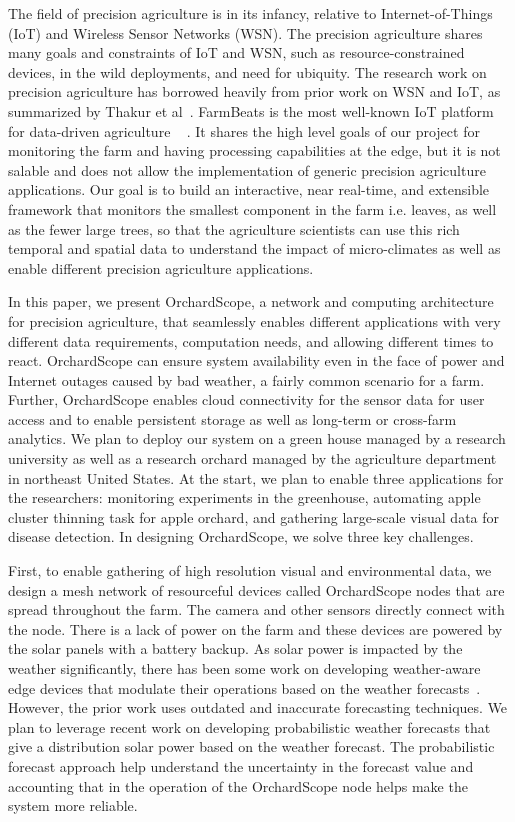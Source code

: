 The field of precision agriculture is in its infancy, relative to Internet-of-Things (IoT) and Wireless Sensor Networks (WSN). The precision agriculture shares many goals and constraints of IoT and WSN, such as resource-constrained devices, in the wild deployments, and need for ubiquity. The research work on precision agriculture has borrowed heavily from prior work on WSN and IoT, as summarized by Thakur et al~\cite{thakur2019applicability}. FarmBeats is the most well-known IoT platform for data-driven agriculture
~\cite{vasisht2017farmbeats, kapetanovic2017experiences, jain2019low}
. It shares the high level goals of our project for monitoring the farm and having processing capabilities at the edge, but it is not salable and does not allow the implementation of generic precision agriculture applications. 
Our goal is to build an interactive, near real-time, and extensible framework that monitors the smallest component in the farm i.e. leaves, as well as the fewer large trees, so that the agriculture scientists can use this rich temporal and spatial data to understand the impact of micro-climates as well as enable different precision agriculture applications.

In this paper, we present OrchardScope, a network and computing architecture for precision agriculture, that seamlessly enables different applications with very different data requirements, computation needs, and allowing different times to react. OrchardScope can ensure system availability  even  in  the  face  of  power  and  Internet  outages caused by bad weather, a fairly common scenario for a farm.  Further, OrchardScope enables cloud connectivity for the sensor data for user access and to enable persistent storage as well as long-term or cross-farm analytics. We plan to deploy our system on a green house managed by a research university as well as a research orchard managed by the agriculture department in northeast United States. At the start, we plan to enable three applications for the researchers: monitoring experiments in the greenhouse, automating apple cluster thinning task for apple orchard, and gathering large-scale visual data for disease detection. In designing OrchardScope, we solve three key challenges. 

First, to enable gathering of high resolution visual and environmental data, we design a mesh network of resourceful devices called OrchardScope nodes that are spread throughout the farm. The camera and other sensors directly connect with the node. There is a lack of power on the farm and these devices are powered by the solar panels with a battery backup. As solar power is impacted by the weather significantly, there has been some work on developing weather-aware edge devices that modulate their operations based on the weather forecasts~\cite{vasisht2017farmbeats}. However, the prior work uses outdated and inaccurate forecasting techniques. We plan to leverage recent work on developing probabilistic weather forecasts that give a distribution solar power based on the weather forecast. The probabilistic forecast approach help understand the uncertainty in the forecast value and accounting that in the operation of the OrchardScope node helps make the system more reliable. 

